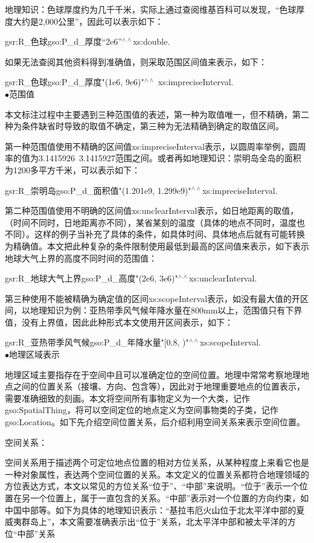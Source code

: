 地理知识：色球厚度约为几千千米，实际上通过查阅维基百科可以发现，“色球厚度大约是2,000公里”，因此可以表示如下：

gsr:R\_色球\quad gso:P\_d\_厚度\quad “2e6”$^{\land\land}$xs:double\quad .

如果无法查阅其他资料得到准确值，则采取范围区间值来表示，如下：

gsr:R\_色球\quad gso:P\_d\_厚度\quad "(1e6, 9e6)"$^{\land\land}$ xs:impreciseInterval\quad .
\\

$\bullet$范围值

本文标注过程中主要遇到三种范围值的表述，第一种为取值唯一，但不精确，第二种为条件缺省时导致的取值不确定，第三种为无法精确到确定的取值区间。

第一种范围值使用不精确的区间值xs:impreciseInterval表示，以圆周率举例，圆周率的值为3.1415926~3.1415927范围之间。或者再如地理知识：崇明岛全岛的面积为1200多平方千米，可以表示如下：

gsr:R\_崇明岛\quad gso:P\_d\_面积值\quad "(1.201e9, 1.299e9)"$^{\land\land}$xs:impreciseInterval\quad .

第二种范围值使用不明确的区间值xs:unclearInterval表示，如日地距离的取值，（时间不同时，日地距离亦不同），某省某刻的温度（具体的地点不同时，温度也不同）。这样的例子当补充了具体的条件，如具体时间、具体地点后就有可能转换为精确值。本文把此种复杂的条件限制使用最低到最高的区间值来表示，如下表示地球大气上界的高度不同时间的范围值：

gsr:R\_地球大气上界\quad gso:P\_d\_高度\quad "(2e6,  3e6)"$^{\land\land}$xs:unclearInterval\quad .

第三种使用不能被精确为确定值的区间xs:scopeInterval表示，如没有最大值的开区间，以地理知识为例：亚热带季风气候年降水量在800mm以上，范围值只有下界值，没有上界值，因此此种形式本文使用开区间表示，如下：


gsr:R\_亚热带季风气候\quad gso:P\_d\_年降水量\quad "[0.8, )"$^{\land\land}$xs:scopeInterval\quad .
\\

$\bullet$地理区域表示

地理区域主要指存在于空间中且可以准确定位的空间位置。地理中常常考察地理地点之间的位置关系（接壤、方向、包含等），因此对于地理重要地点的位置表示，需要准确细致的刻画。本文将空间所有事物定义为一个大类，记作gso:SpatialThing，将可以空间定位的地点定义为空间事物类的子类，记作gso:Location。如下先介绍空间位置关系，后介绍利用空间关系来表示空间位置。

空间关系：

空间关系用于描述两个可定位地点位置的相对方位关系，从某种程度上来看它也是一种对象属性，表达两个空间位置的关系。本文定义的位置关系都符合地理领域的方位表达方式，本文以常见的方位关系“位于”、“中部”来说明。“位于”表示一个位置在另一个位置上，属于一直包含的关系。“中部”表示对一个位置的方向约束，如中国中部等。如下为具体的地理知识表示：“基拉韦厄火山位于北太平洋中部的夏威夷群岛上”，本文需要准确表示出“位于”关系，北太平洋中部和被太平洋的方位“中部”关系


